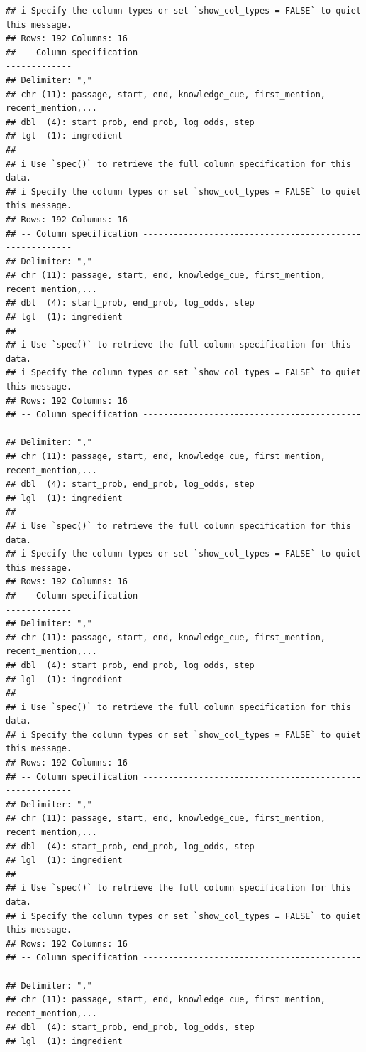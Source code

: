\documentclass[
]{article}
\begin{document}
\begin{verbatim}
## i Specify the column types or set `show_col_types = FALSE` to quiet this message.
## Rows: 192 Columns: 16
## -- Column specification --------------------------------------------------------
## Delimiter: ","
## chr (11): passage, start, end, knowledge_cue, first_mention, recent_mention,...
## dbl  (4): start_prob, end_prob, log_odds, step
## lgl  (1): ingredient
## 
## i Use `spec()` to retrieve the full column specification for this data.
## i Specify the column types or set `show_col_types = FALSE` to quiet this message.
## Rows: 192 Columns: 16
## -- Column specification --------------------------------------------------------
## Delimiter: ","
## chr (11): passage, start, end, knowledge_cue, first_mention, recent_mention,...
## dbl  (4): start_prob, end_prob, log_odds, step
## lgl  (1): ingredient
## 
## i Use `spec()` to retrieve the full column specification for this data.
## i Specify the column types or set `show_col_types = FALSE` to quiet this message.
## Rows: 192 Columns: 16
## -- Column specification --------------------------------------------------------
## Delimiter: ","
## chr (11): passage, start, end, knowledge_cue, first_mention, recent_mention,...
## dbl  (4): start_prob, end_prob, log_odds, step
## lgl  (1): ingredient
## 
## i Use `spec()` to retrieve the full column specification for this data.
## i Specify the column types or set `show_col_types = FALSE` to quiet this message.
## Rows: 192 Columns: 16
## -- Column specification --------------------------------------------------------
## Delimiter: ","
## chr (11): passage, start, end, knowledge_cue, first_mention, recent_mention,...
## dbl  (4): start_prob, end_prob, log_odds, step
## lgl  (1): ingredient
## 
## i Use `spec()` to retrieve the full column specification for this data.
## i Specify the column types or set `show_col_types = FALSE` to quiet this message.
## Rows: 192 Columns: 16
## -- Column specification --------------------------------------------------------
## Delimiter: ","
## chr (11): passage, start, end, knowledge_cue, first_mention, recent_mention,...
## dbl  (4): start_prob, end_prob, log_odds, step
## lgl  (1): ingredient
## 
## i Use `spec()` to retrieve the full column specification for this data.
## i Specify the column types or set `show_col_types = FALSE` to quiet this message.
## Rows: 192 Columns: 16
## -- Column specification --------------------------------------------------------
## Delimiter: ","
## chr (11): passage, start, end, knowledge_cue, first_mention, recent_mention,...
## dbl  (4): start_prob, end_prob, log_odds, step
## lgl  (1): ingredient

\end{verbatim}
\end{document}
